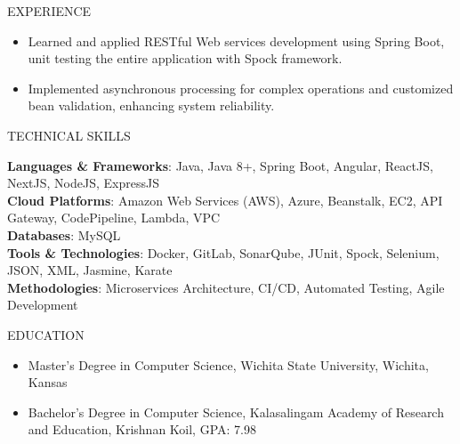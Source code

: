 \documentclass{resume} %
\begin{document}
\begin{rSection}{EXPERIENCE}
\begin{flushleft}
\begin{itemize}
                                    \item Learned and applied RESTful Web services development using Spring Boot, unit testing the entire application with Spock framework.
                                    \item Implemented asynchronous processing for complex operations and customized bean validation, enhancing system reliability.
                            \end{itemize}
            \vspace{0.5em}
            \end{flushleft} 
\end{rSection}

\begin{rSection}{TECHNICAL SKILLS}
    \begin{flushleft}
                    \textbf{Languages \& Frameworks}: Java, Java 8+, Spring Boot, Angular, ReactJS, NextJS, NodeJS, ExpressJS \\
                    \textbf{Cloud Platforms}: Amazon Web Services (AWS), Azure, Beanstalk, EC2, API Gateway, CodePipeline, Lambda, VPC \\
                    \textbf{Databases}: MySQL \\
                    \textbf{Tools \& Technologies}: Docker, GitLab, SonarQube, JUnit, Spock, Selenium, JSON, XML, Jasmine, Karate \\
                    \textbf{Methodologies}: Microservices Architecture, CI/CD, Automated Testing, Agile Development \\
            \end{flushleft}
\end{rSection}

\begin{rSection}{EDUCATION}
    \begin{flushleft}
    \begin{itemize}
                    \item Master's Degree in Computer Science, Wichita State University, Wichita, Kansas \\
                    \item Bachelor's Degree in Computer Science, Kalasalingam Academy of Research and Education, Krishnan Koil, GPA: 7.98 \\
            \end{itemize}
    \end{flushleft}
\end{rSection}
\end{document}
